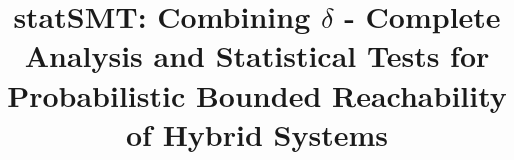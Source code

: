 \documentclass[runningheads,a4paper]{llncs}
\begin{document}
\mainmatter  %

\title{statSMT: Combining $\delta$ - Complete Analysis and Statistical Tests for Probabilistic Bounded Reachability of Hybrid Systems}


%
%


%

%
%

\maketitle
\end{document}
